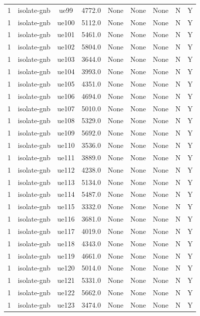 \begin{table}[ht]
\begin{tabular}{|c|c|c|c|c|c|c|c|c|}
1 & isolate-gnb & ue99 & 4772.0 & None & None & None & N & Y \\
1 & isolate-gnb & ue100 & 5112.0 & None & None & None & N & Y \\
1 & isolate-gnb & ue101 & 5461.0 & None & None & None & N & Y \\
1 & isolate-gnb & ue102 & 5804.0 & None & None & None & N & Y \\
1 & isolate-gnb & ue103 & 3644.0 & None & None & None & N & Y \\
1 & isolate-gnb & ue104 & 3993.0 & None & None & None & N & Y \\
1 & isolate-gnb & ue105 & 4351.0 & None & None & None & N & Y \\
1 & isolate-gnb & ue106 & 4694.0 & None & None & None & N & Y \\
1 & isolate-gnb & ue107 & 5010.0 & None & None & None & N & Y \\
1 & isolate-gnb & ue108 & 5329.0 & None & None & None & N & Y \\
1 & isolate-gnb & ue109 & 5692.0 & None & None & None & N & Y \\
1 & isolate-gnb & ue110 & 3536.0 & None & None & None & N & Y \\
1 & isolate-gnb & ue111 & 3889.0 & None & None & None & N & Y \\
1 & isolate-gnb & ue112 & 4238.0 & None & None & None & N & Y \\
1 & isolate-gnb & ue113 & 5134.0 & None & None & None & N & Y \\
1 & isolate-gnb & ue114 & 5487.0 & None & None & None & N & Y \\
1 & isolate-gnb & ue115 & 3332.0 & None & None & None & N & Y \\
1 & isolate-gnb & ue116 & 3681.0 & None & None & None & N & Y \\
1 & isolate-gnb & ue117 & 4019.0 & None & None & None & N & Y \\
1 & isolate-gnb & ue118 & 4343.0 & None & None & None & N & Y \\
1 & isolate-gnb & ue119 & 4661.0 & None & None & None & N & Y \\
1 & isolate-gnb & ue120 & 5014.0 & None & None & None & N & Y \\
1 & isolate-gnb & ue121 & 5331.0 & None & None & None & N & Y \\
1 & isolate-gnb & ue122 & 5662.0 & None & None & None & N & Y \\
1 & isolate-gnb & ue123 & 3474.0 & None & None & None & N & Y \\

\end{tabular}
\end{table}
